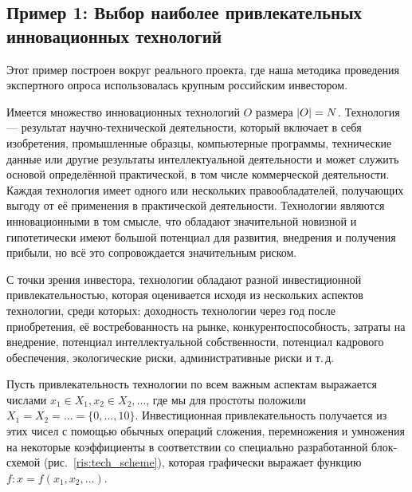 
\subsection{Пример 1: Выбор наиболее привлекательных инновационных технологий}

Этот пример построен вокруг реального проекта, где наша методика проведения экспертного опроса использовалась крупным российским инвестором. %

Имеется множество инновационных технологий $O$ размера $\left| O \right| = N$.  Технология --- результат научно-технической деятельности, который включает в себя изобретения, промышленные образцы, компьютерные программы, технические данные или другие результаты интеллектуальной деятельности и может служить основой определённой практической, в том числе коммерческой деятельности. Каждая технология имеет одного или нескольких правообладателей, получающих выгоду от её применения в практической деятельности. Технологии являются инновационными в том смысле, что обладают значительной новизной и гипотетически имеют большой потенциал для развития, внедрения и получения прибыли, но всё это сопровождается значительным риском. 


С точки зрения инвестора, технологии обладают разной инвестиционной привлекательностью, которая оценивается исходя из нескольких аспектов технологии, среди которых: доходность технологии через год после приобретения, её востребованность на рынке, конкурентоспособность, затраты на внедрение, потенциал интеллектуальной собственности, потенциал кадрового обеспечения, экологические риски, административные риски и т.\,д. 

Пусть привлекательность технологии по всем важным аспектам выражается числами $x_1 \in X_1, x_2 \in X_2, ...$, где мы для простоты положили $X_1 = X_2 = ... = \{0, ..., 10\}$. Инвестиционная привлекательность получается из этих чисел с помощью обычных операций сложения, перемножения и умножения на некоторые коэффициенты в соответствии со специально разработанной блок-схемой (рис.~\ref{ris:tech_scheme}), которая графически выражает функцию $f: x = f(x_1, x_2, ...)$. 

